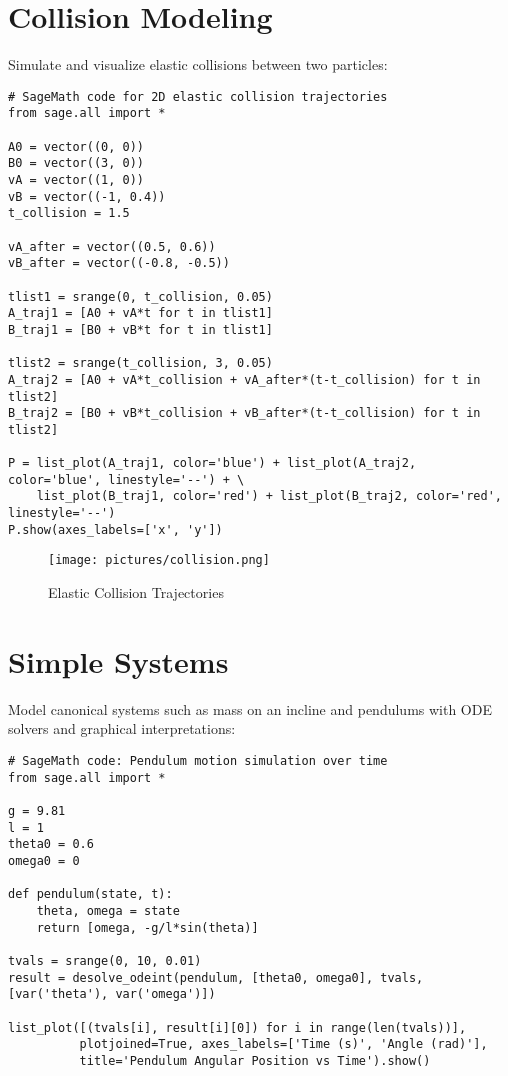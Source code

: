 \documentclass[12pt]{book}
\begin{document}
\section{Collision Modeling}

Simulate and visualize elastic collisions between two particles:

\begin{verbatim}
# SageMath code for 2D elastic collision trajectories
from sage.all import *

A0 = vector((0, 0))
B0 = vector((3, 0))
vA = vector((1, 0))
vB = vector((-1, 0.4))
t_collision = 1.5

vA_after = vector((0.5, 0.6))
vB_after = vector((-0.8, -0.5))

tlist1 = srange(0, t_collision, 0.05)
A_traj1 = [A0 + vA*t for t in tlist1]
B_traj1 = [B0 + vB*t for t in tlist1]

tlist2 = srange(t_collision, 3, 0.05)
A_traj2 = [A0 + vA*t_collision + vA_after*(t-t_collision) for t in tlist2]
B_traj2 = [B0 + vB*t_collision + vB_after*(t-t_collision) for t in tlist2]

P = list_plot(A_traj1, color='blue') + list_plot(A_traj2, color='blue', linestyle='--') + \
    list_plot(B_traj1, color='red') + list_plot(B_traj2, color='red', linestyle='--')
P.show(axes_labels=['x', 'y'])
\end{verbatim}

\begin{figure}[H]
  \centering
  \texttt{[image: pictures/collision.png]}
  \caption{Elastic Collision Trajectories}
  \label{fig:collision}
\end{figure}

\section{Simple Systems}

Model canonical systems such as mass on an incline and pendulums with ODE solvers and graphical interpretations:

\begin{verbatim}
# SageMath code: Pendulum motion simulation over time
from sage.all import *

g = 9.81
l = 1
theta0 = 0.6
omega0 = 0

def pendulum(state, t):
    theta, omega = state
    return [omega, -g/l*sin(theta)]

tvals = srange(0, 10, 0.01)
result = desolve_odeint(pendulum, [theta0, omega0], tvals, [var('theta'), var('omega')])

list_plot([(tvals[i], result[i][0]) for i in range(len(tvals))],
          plotjoined=True, axes_labels=['Time (s)', 'Angle (rad)'],
          title='Pendulum Angular Position vs Time').show()
\end{verbatim}
\end{document}
